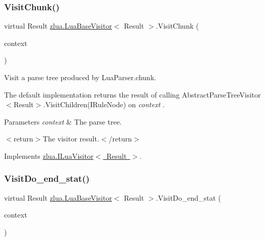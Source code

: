 \subsubsection{\texorpdfstring{Visit\+Chunk()}{VisitChunk()}}
{\footnotesize\ttfamily virtual Result \mbox{\hyperlink{classzlua_1_1_lua_base_visitor}{zlua.\+Lua\+Base\+Visitor}}$<$ Result $>$.Visit\+Chunk (\begin{DoxyParamCaption}\item[{\mbox{[}\+Not\+Null\mbox{]} \mbox{\hyperlink{classzlua_1_1_lua_parser_1_1_chunk_context}{Lua\+Parser.\+Chunk\+Context}}}]{context }\end{DoxyParamCaption})\hspace{0.3cm}{\ttfamily [virtual]}}



Visit a parse tree produced by Lua\+Parser.\+chunk. 

The default implementation returns the result of calling Abstract\+Parse\+Tree\+Visitor$<$\+Result$>$.\+Visit\+Children(\+I\+Rule\+Node) on {\itshape context} . 


\begin{DoxyParams}{Parameters}
{\em context} & The parse tree.\\
\hline
\end{DoxyParams}
$<$return$>$The visitor result.$<$/return$>$ 

Implements \mbox{\hyperlink{interfacezlua_1_1_i_lua_visitor_a48ac01ae4a56895145eb63223a511cdf}{zlua.\+I\+Lua\+Visitor$<$ Result $>$}}.

\mbox{\label{classzlua_1_1_lua_base_visitor_aa97f734c7ba79e7b5ccde1506774e0ec}} 
\subsubsection{\texorpdfstring{Visit\+Do\+\_\+end\+\_\+stat()}{VisitDo\_end\_stat()}}
{\footnotesize\ttfamily virtual Result \mbox{\hyperlink{classzlua_1_1_lua_base_visitor}{zlua.\+Lua\+Base\+Visitor}}$<$ Result $>$.Visit\+Do\+\_\+end\+\_\+stat (\begin{DoxyParamCaption}\item[{\mbox{[}\+Not\+Null\mbox{]} \mbox{\hyperlink{classzlua_1_1_lua_parser_1_1_do__end__stat_context}{Lua\+Parser.\+Do\+\_\+end\+\_\+stat\+Context}}}]{context }\end{DoxyParamCaption})\hspace{0.3cm}{\ttfamily [virtual]}}



